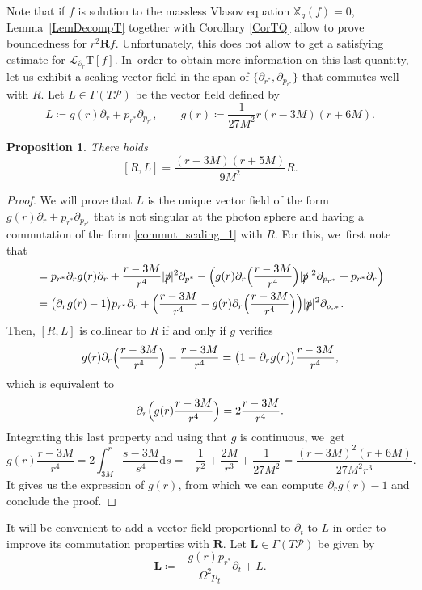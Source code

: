 \documentclass[JEP,XML,SOM,Unicode,published]{cedram}
\theoremstyle{plain}
\newtheorem{proposition}{Proposition}[section]
\theoremstyle{definition}
\newcommand\T{{\mathbb{X}}}
\begin{document}
Note that if $f$ is solution to the massless Vlasov equation $\T_g(f)=0$, Lemma~\ref{LemDecompT} together with Corollary \ref{CorTQ} allow to prove boundedness for $r^2 \pmb{R}f$. Unfortunately, this does not allow to get a satisfying estimate for $\mathcal{L}_{\partial_r}\mathrm{T}[f]$. In~order to obtain more information on this last quantity, let us exhibit a scaling vector field in the span of $\{\partial_{r^*},\partial_{p_{r^*}}\}$ that commutes well with $R$. Let $L \in \Gamma(T \mathcal{P})$ be the vector field defined by
\[
L \coloneqq g(r) \partial_r + p_{r^*} \partial_{p_{r^*}}, \qquad g(r) \coloneqq \frac{1}{27M^2}r(r-3M)(r+6M).
\]

\begin{proposition}\label{ProL}
There holds
\begin{equation}\label{commut_scaling_1}
[R,L]=\frac{(r-3M)(r+5M)}{9M^2}R.
\end{equation}
\end{proposition}

\begin{proof}
We will prove that $L$ is the unique vector field of the form $g(r) \partial_r + p_{r^*} \partial_{p_{r^*}}$ that is not singular at the photon sphere and having a commutation of the form \eqref{commut_scaling_1} with $R$. For this, we~first note that
\begin{align*}
[R,L] &= p_{r^*} \partial_r g(r) \partial_r+\frac{r-3M}{r^4}|\slashed{p}|^2 \partial_{p^*}-\Bigl(g(r) \partial_r \Bigl(\frac{r-3M}{r^4} \Bigr) |\slashed{p}|^2 \partial_{p_{r^*}}+p_{r^*}\partial_r \Bigr) \\
& = \bigl(\partial_r g(r)-1 \bigr) p_{r^*} \partial_r+ \Bigl(\frac{r-3M}{r^4} -g(r) \partial_r \Bigl(\frac{r-3M}{r^4} \Bigr) \Bigr) |\slashed{p}|^2\partial_{p_{r^*}}.
\end{align*}
Then, $[R,L]$ is collinear to $R$ if and only if $g$ verifies
\[
g(r)\partial_r \Bigl(\frac{r-3M}{r^4} \Bigr)-\frac{r-3M}{r^4}=\bigl(1-\partial_r g(r) \bigr)\frac{r-3M}{r^4},
\]
which is equivalent to
\[
\partial_r \Bigl(g(r) \frac{r-3M}{r^4}\Bigr)=2\frac{r-3M}{r^4}.
\]
Integrating this last property and using that $g$ is continuous, we~get
\[
g(r)\frac{r-3M}{r^4} = 2\int_{3M}^r \frac{s-3M}{s^4} \mathrm{d}s =-\frac{1}{r^2}+\frac{2M}{r^3}+\frac{1}{27M^2} = \frac{(r-3M)^2(r+6M)}{27M^2r^3}.
\]
It gives us the expression of $g(r)$, from which we can compute $\partial_r g(r)-1$ and conclude the proof.
\end{proof}

It will be convenient to add a vector field proportional to $\partial_t$ to $L$ in order to improve its commutation properties with $\pmb{R}$. Let $\pmb{L} \in \Gamma(T \mathcal{P})$ be given by
\begin{equation}\label{eq:defL}
\pmb{L} \coloneqq -\frac{g(r)p_{r^*}}{\Omega^2p_t} \partial_t + L.
\end{equation}
\end{document}
